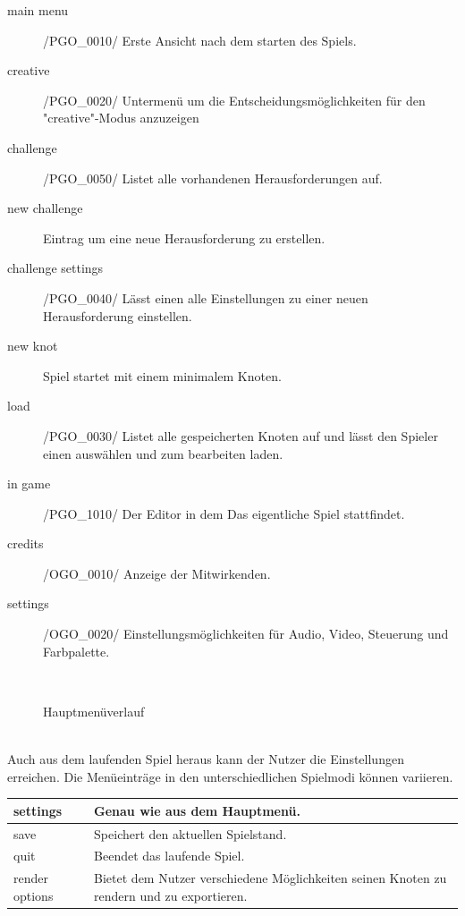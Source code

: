	\begin{description}
		\item[main menu] /PGO\_0010/ Erste Ansicht nach dem starten des Spiels.
		\item[creative] /PGO\_0020/ Untermenü um die Entscheidungsmöglichkeiten für den "creative"-Modus anzuzeigen
		\item[challenge] /PGO\_0050/ Listet alle vorhandenen Herausforderungen auf.
		\item[new challenge] Eintrag um eine neue Herausforderung zu erstellen.
		\item[challenge settings] /PGO\_0040/ Lässt einen alle Einstellungen zu einer neuen Herausforderung einstellen.
		\item[new knot] Spiel startet mit einem minimalem Knoten.
		\item[load] /PGO\_0030/ Listet alle gespeicherten Knoten auf und lässt den Spieler einen auswählen und zum bearbeiten laden.
		\item[in game] /PGO\_1010/ Der Editor in dem Das eigentliche Spiel stattfindet.
		\item[credits] /OGO\_0010/ Anzeige der Mitwirkenden.
		\item[settings] /OGO\_0020/ Einstellungsmöglichkeiten für Audio, Video, Steuerung und Farbpalette.
	\end{description}
   
   ~\\
    
	\begin{figure}[h]
		\centering
	 	
	 	\caption{Hauptmenüverlauf}
	\end{figure}
	
	\clearpage
	~\\
	
	Auch aus dem laufenden Spiel heraus kann der Nutzer die Einstellungen erreichen. Die Menüeinträge in den unterschiedlichen Spielmodi können variieren.

	\begin{longtable}{|p{}|p{}|}
	
	\hline
	settings & Genau wie aus dem Hauptmenü.\\
	\hline
	save & Speichert den aktuellen Spielstand.\\
	\hline
	quit & Beendet das laufende Spiel. \\
	\hline
	render options & Bietet dem Nutzer verschiedene Möglichkeiten seinen Knoten zu rendern und zu exportieren.\\
	\hline
	
	\end{longtable}
	
